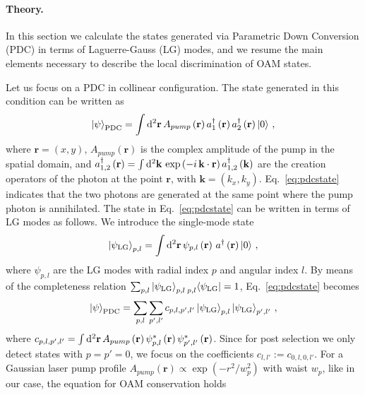 \documentclass[
reprint,
amsmath,amssymb,
aps,
showkeys
]{revtex4-2}
\begin{document}
\paragraph*{\label{sec:theory} Theory.}
In this section we calculate the states generated via Parametric Down Conversion (PDC) in terms of Laguerre-Gauss (LG) modes, and we resume the main elements necessary to describe the local discrimination of OAM states.

Let us focus on a PDC in collinear configuration.
The state generated in this condition can be written as \cite{Miatto2011}
%
\begin{align}\label{eq:pdcstate}
    \left|\psi\right>_{\rm PDC} = 
    \int {\rm d}^2\mathbf{r} \, A_{pump}\left(\mathbf{r}\right) a^{\dagger}_1\left(\mathbf{r}\right) a^{\dagger}_2\left(\mathbf{r}\right) \left|0\right>
    \, ,
\end{align}
%
where $\mathbf{r}=\left(x,y\right)$, $A_{pump}\left(\mathbf{r}\right)$ is the complex amplitude of the pump in the spatial domain, and $a^{\dagger}_{1,2}\left(\mathbf{r}\right) = \int {\rm d}^2 \mathbf{k} \, \exp{\left(-i\,\mathbf{k} \cdot \mathbf{r}\right)} \, a^{\dagger}_{1,2}\left(\mathbf{k}\right)$ are the creation operators of the photon at the point $\mathbf{r}$, with $\mathbf{k}=\left(k_x,k_y\right)$.
Eq.~\ref{eq:pdcstate} indicates that the two photons are generated at the same point where the pump photon is annihilated.
The state in Eq.~\ref{eq:pdcstate} can be written in terms of LG modes as follows.
We introduce the single-mode state
%
\begin{align}
    \left|\psi_{\rm LG}\right>_{p,l} =
    \int {\rm d}^2 \mathbf{r} \, \psi_{p,l}\left(\mathbf{r}\right) \, a^{\dagger}\left(\mathbf{r}\right) \left|0\right>
    \, ,
\end{align}
%
where $\psi_{p,l}$ are the LG modes with radial index $p$ and angular index $l$.
By means of the completeness relation $\sum_{p,l} \left|\psi_{\rm LG}\right>_{p,l} \prescript{}{p,l}{\left<\psi_{\rm LG}\right|} = 1$, Eq.~\ref{eq:pdcstate} becomes
%
\begin{align}
    \left|\psi\right>_{\rm PDC} = 
    \sum_{p,l}\sum_{p',l'}
    c_{p,l,p',l'} \left|\psi_{\rm LG}\right>_{p,l} \left|\psi_{\rm LG}\right>_{p',l'}
    \, ,
\end{align}
%
where $c_{p,l,p',l'} = \int {\rm d}^2 \mathbf{r} \, A_{pump}\left(\mathbf{r}\right) \psi^*_{p,l}\left(\mathbf{r}\right) \psi^*_{p',l'}\left(\mathbf{r}\right)$. Since for post selection we only detect states with $p=p'=0$, we focus on the coefficients $c_{l,l'}:= c_{0,l,0,l'}$. 
For a Gaussian laser pump profile $A_{pump}\left(\mathbf{r}\right) \propto \exp{\left( - r^2 / w_p^2 \right)}$ with waist $w_p$, like in our case, the equation for OAM conservation holds 
\end{document}
